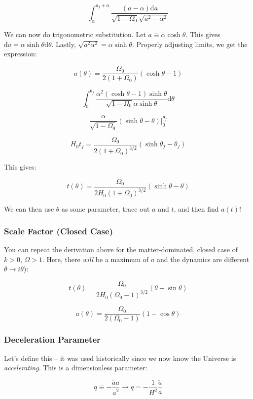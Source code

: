 \documentclass{article}
\newcommand{\be}{\begin{equation}}
\newcommand{\ee}{\end{equation}}
\begin{document}
\be
\int_\alpha^{a_f + \alpha} \frac{\left(a-\alpha\right)\mathrm{d}a}{\sqrt{1-\Omega_0} \sqrt{a^2 - \alpha^2}}
\ee

We can now do trigonometric substitution. Let $a\equiv \alpha \cosh \theta$. This gives $\mathrm{d}a = \alpha \sinh\theta \mathrm{d}\theta$. Lastly, $\sqrt{a^2\alpha^2} = \alpha\sinh\theta$. Properly adjusting limits, we get the expression:

\be
\boxed{a(\theta) = \frac{\Omega_0}{2\left(1+\Omega_0\right)}\left(\cosh\theta-1\right)}
\ee

\be
\int_{0}^{\theta_f} \frac{\alpha^2\left(\cosh\theta-1\right)\sinh\theta}{\sqrt{1-\Omega_0} \alpha \sinh\theta} \mathrm{d}\theta
\ee

\be
\frac{\alpha}{\sqrt{1-\Omega_0}}\left(\sinh\theta - \theta\right)\rvert_0^{\theta_f}
\ee

\be
H_0 t_f = \frac{\Omega_0}{2\left(1+\Omega_0\right)^{3/2}} \left(\sinh\theta_f -\theta_f\right)
\ee

This gives:

\be
\boxed{t(\theta) = \frac{\Omega_0}{2H_0\left(1+\Omega_0\right)^{3/2}}\left(\sinh\theta - \theta\right)}
\ee

We can then use $\theta$ as some parameter, trace out $a$ and $t$, and then find $a(t)$!

\subsubsection{Scale Factor (Closed Case)}

You can repeat the derivation above for the matter-dominated, closed case of $k >0$, $\Omega > 1$. Here, there \textit{will} be a maximum of $a$ and the dynamics are different $\theta \rightarrow i \theta$):

\be
\boxed{t(\theta) = \frac{\Omega_0}{2H_0\left(\Omega_0-1\right)^{3/2}}\left(\theta-\sin\theta\right)}
\ee

\be
\boxed{a(\theta) = \frac{\Omega_0}{2\left(\Omega_0-1\right)}\left(1-\cos\theta\right)}
\ee

\subsubsection{Deceleration Parameter}

Let's define this -- it was used historically since we now know the Universe is \textit{accelerating}. This is a dimensionless parameter:

\be
q \equiv -\frac{\ddot{a}a}{\dot{a}^2} \rightarrow q = - \frac{1}{H^2} \frac{\ddot{a}}{a}
\ee
\end{document}
